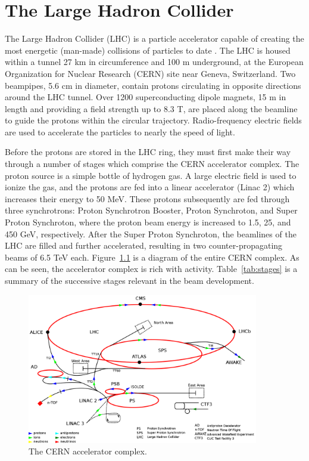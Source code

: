\chapter{The Large Hadron Collider}
\label{chap:lhc}

The Large Hadron Collider (LHC) \cite{Evans:2008zzb} is a particle accelerator capable of creating the most energetic (man-made) collisions of particles to date . The LHC is housed within a tunnel 27 km in circumference and 100 m underground, at the European Organization for Nuclear Research (CERN) site near Geneva, Switzerland. Two beampipes, 5.6 cm in diameter, contain protons circulating in opposite directions around the LHC tunnel. Over 1200 superconducting dipole magnets, 15 m in length and providing a field strength up to 8.3 T, are placed along the beamline to guide the protons within the circular trajectory. Radio-frequency electric fields are used to accelerate the particles to nearly the speed of light.

Before the protons are stored in the LHC ring, they must first make their way through a number of stages which comprise the CERN accelerator complex. The proton source is a simple bottle of hydrogen gas. A large electric field is used to ionize the gas, and the protons are fed into a linear accelerator (Linac 2) which increases their energy to 50 MeV. These protons subsequently are fed through three synchrotrons: Proton Synchrotron Booster, Proton Synchroton, and Super Proton Synchroton, where the proton beam energy is increased to 1.5, 25, and 450 GeV, respectively. After the Super Proton Synchroton, the beamlines of the LHC are filled and further accelerated, resulting in two counter-propagating beams of 6.5 TeV each. Figure~\ref{fig:lhc} is a diagram of the entire CERN complex. As can be seen, the accelerator complex is rich with activity. Table~\ref{tab:stages} is a summary of the successive stages relevant in the beam development.

\begin{figure}
\centering
\includegraphics[width=0.9\textwidth]{figs/lhcschematic.png}
\caption[The CERN accelerator complex.]{The CERN accelerator complex. \cite{wiki:lhc}}
\label{fig:lhc}
\end{figure}

